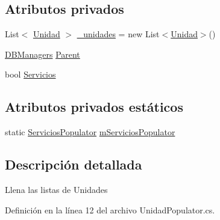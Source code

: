 \subsection*{Atributos privados}
\begin{DoxyCompactItemize}
\item 
List$<$ \hyperlink{class_proyecto___integrador__3_1_1_tipos_dato_1_1_unidad}{Unidad} $>$ \hyperlink{class_proyecto___integrador__3_1_1_d_b_managers_1_1_unidad_populator_a0704f72a36a446b2f4643226b9eb5917}{\-\_\-unidades} = new List$<$\hyperlink{class_proyecto___integrador__3_1_1_tipos_dato_1_1_unidad}{Unidad}$>$()
\item 
\hyperlink{class_proyecto___integrador__3_1_1_d_b_managers}{D\-B\-Managers} \hyperlink{class_proyecto___integrador__3_1_1_d_b_managers_1_1_unidad_populator_af564e36862498316aa1c5483c7cd8bc1}{Parent}
\item 
bool \hyperlink{class_proyecto___integrador__3_1_1_d_b_managers_1_1_unidad_populator_afe3e8b71dfc129ff61be9e8378403d60}{Servicios}
\end{DoxyCompactItemize}
\subsection*{Atributos privados estáticos}
\begin{DoxyCompactItemize}
\item 
static \hyperlink{class_proyecto___integrador__3_1_1_d_b_managers_1_1_servicios_populator}{Servicios\-Populator} \hyperlink{class_proyecto___integrador__3_1_1_d_b_managers_1_1_unidad_populator_a415439e84a77c50a90a5796f8f0e646d}{m\-Servicios\-Populator}
\end{DoxyCompactItemize}


\subsection{Descripción detallada}


Llena las listas de Unidades 

Definición en la línea 12 del archivo Unidad\-Populator.\-cs.



